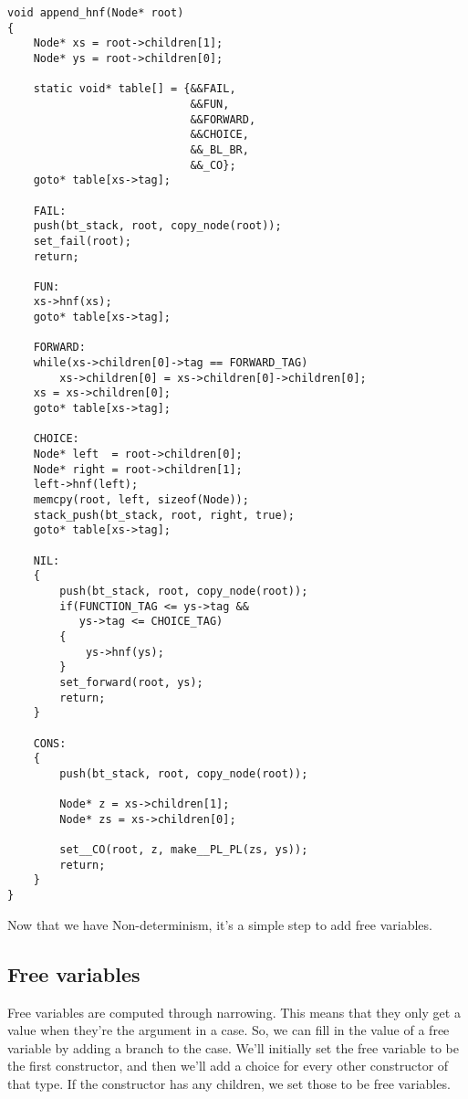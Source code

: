 \documentclass{article}
\begin{document}
\begin{verbatim}
void append_hnf(Node* root)
{
    Node* xs = root->children[1];
    Node* ys = root->children[0];

    static void* table[] = {&&FAIL, 
                            &&FUN, 
                            &&FORWARD, 
                            &&CHOICE, 
                            &&_BL_BR, 
                            &&_CO};
    goto* table[xs->tag];

    FAIL:
    push(bt_stack, root, copy_node(root));
    set_fail(root);
    return;

    FUN:
    xs->hnf(xs);
    goto* table[xs->tag];

    FORWARD:
    while(xs->children[0]->tag == FORWARD_TAG)
        xs->children[0] = xs->children[0]->children[0];
    xs = xs->children[0];
    goto* table[xs->tag];

    CHOICE:
    Node* left  = root->children[0];
    Node* right = root->children[1];
    left->hnf(left);
    memcpy(root, left, sizeof(Node));
    stack_push(bt_stack, root, right, true);
    goto* table[xs->tag];

    NIL:
    {
        push(bt_stack, root, copy_node(root));
        if(FUNCTION_TAG <= ys->tag &&
           ys->tag <= CHOICE_TAG)
        {
            ys->hnf(ys);
        }
        set_forward(root, ys);
        return;
    }

    CONS:
    {
        push(bt_stack, root, copy_node(root));

        Node* z = xs->children[1];
        Node* zs = xs->children[0];

        set__CO(root, z, make__PL_PL(zs, ys));
        return;
    }
}
\end{verbatim}

Now that we have Non-determinism, it's a simple step to add free variables.

\subsection{Free variables}

Free variables are computed through narrowing.
This means that they only get a value when they're the argument in a case.
So, we can fill in the value of a free variable by adding a branch to the case.
We'll initially set the free variable to be the first constructor,
and then we'll add a choice for every other constructor of that type.
If the constructor has any children, we set those to be free variables.
\end{document}
